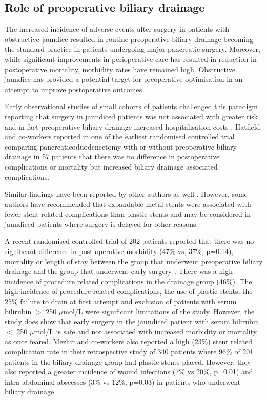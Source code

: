 \subsection{Role of preoperative biliary drainage}
\label{sec:preoperative_biliary_drainage}
The increased incidence of adverse events after surgery in patients with obstructive jaundice resulted in routine preoperative biliary drainage becoming the standard practice in patients undergoing major pancreatic surgery. 
Moreover, while significant improvements in perioperative care has resulted in reduction in postoperative mortality, morbidity rates have remained high. 
Obstructive jaundice has provided a potential target for preoperative optimisation in an attempt to improve postoperative outcomes. 

Early observational studies of small cohorts of patients challenged this paradigm reporting that surgery in jaundiced patients was not associated with greater risk and in fact preoperative biliary drainage increased hospitalisation costs \parencite{snellen_influence_1985, bakkevold_morbidity_1993, pitt_does_1985}. 
Hatfield and co-workers reported in one of the earliest randomised controlled trial comparing pancreaticoduodenectomy with or without preoperative biliary drainage in 57 patients that there was no difference in postoperative complications or mortality but increased biliary drainage associated complications. \parencite{hatfield_preoperative_1982}

Similar findings have been reported by other authors as well \parencite{lai_preoperative_1994, lai_preoperative_1994, jagannath_effect_2005}. 
However, some authors have recommended that expandable metal stents were associated with fewer stent related complications than plastic stents and may be considered in jaundiced patients where surgery is delayed for other reasons. \parencite{wasan_use_2005, mullen_pancreaticoduodenectomy_2005}

A recent randomised controlled trial of 202 patients reported that there was no significant difference in post-operative morbidity (47\% vs, 37\%, p=0.14), mortality or length of stay between the group that underwent preoperative biliary drainage and the group that underwent early surgery \parencite{van_der_gaag_preoperative_2010}. 
There was a high incidence of procedure related complications in the drainage group (46\%). 
The high incidence of procedure related complications, the use of plastic stents, the 25\% failure to drain at first attempt and exclusion of patients with serum bilirubin $>$ 250 $\mu$mol/L were significant limitations of the study. 
However, the study does show that early surgery in the jaundiced patient with serum bilirubin $<$ 250 $\mu$mol/L is safe and not associated with increased morbidity or mortality as once feared. 
Mezhir and co-workers also reported a high (23\%) stent related complication rate in their retrospective study of 340 patients where 96\% of 201 patients in the biliary drainage group had plastic stents placed. 
However, they also reported a greater incidence of wound infections (7\% vs 20\%, p=0.01) and intra-abdominal abscesses (3\% vs 12\%, p=0.03) in patients who underwent biliary drainage.

